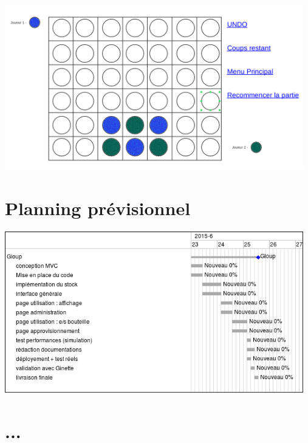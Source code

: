 \documentclass[a4paper,oneside]{article}
\begin{document}
~\\

\includegraphics[width=13cm]{image1.png}






\section{Planning prévisionnel}

\includegraphics[width=13cm]{cdc_gantt.png}


\section{...}



\label{fin}
\end{document}
